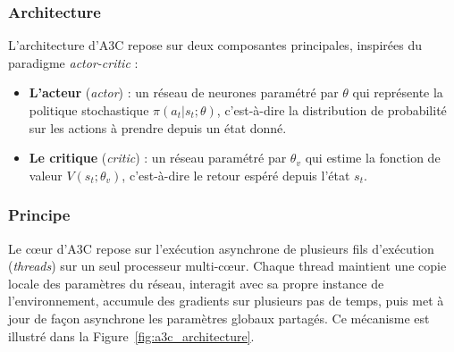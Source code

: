 \subsubsection*{Architecture}

L'architecture d'A3C repose sur deux composantes principales, inspirées du 
paradigme \textit{actor-critic} :

\begin{itemize}[noitemsep, topsep=4pt]
    \item \textbf{L'acteur} (\textit{actor}) : un réseau de neurones 
    paramétré par $\theta$ qui représente la politique stochastique 
    $\pi(a_t | s_t ; \theta)$, c'est-à-dire la distribution de probabilité 
    sur les actions à prendre depuis un état donné.
    \item \textbf{Le critique} (\textit{critic}) : un réseau paramétré par 
    $\theta_v$ qui estime la fonction de valeur $V(s_t ; \theta_v)$, 
    c'est-à-dire le retour espéré depuis l'état $s_t$.
\end{itemize}


\subsubsection*{Principe }

Le cœur d'A3C repose sur l'exécution asynchrone de plusieurs fils d'exécution (\textit{threads}) sur un seul processeur multi-cœur. Chaque thread maintient une copie locale des paramètres du réseau\cite{ref3}, interagit avec sa propre instance de l'environnement, accumule des gradients sur plusieurs pas de temps, puis met à jour de façon asynchrone les paramètres globaux partagés. Ce mécanisme est illustré dans la Figure~\ref{fig:a3c_architecture}.

